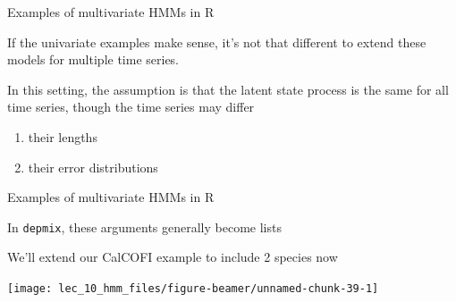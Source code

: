 \documentclass[
  ignorenonframetext,
]{beamer}
\providecommand{\tightlist}{%
  \setlength{\itemsep}{0pt}\setlength{\parskip}{0pt}}
\begin{document}
\begin{frame}{Examples of multivariate HMMs in R}
\protect\hypertarget{examples-of-multivariate-hmms-in-r}{}

If the univariate examples make sense, it's not that different to extend
these models for multiple time series.

In this setting, the assumption is that the latent state process is the
same for all time series, though the time series may differ

\begin{enumerate}
\tightlist
\item
  their lengths
\item
  their error distributions
\end{enumerate}

\end{frame}

\begin{frame}[fragile]{Examples of multivariate HMMs in R}
\protect\hypertarget{examples-of-multivariate-hmms-in-r-1}{}

In \texttt{depmix}, these arguments generally become lists

We'll extend our CalCOFI example to include 2 species now

\begin{center}\texttt{[image: lec\_10\_hmm\_files/figure-beamer/unnamed-chunk-39-1]} \end{center}

\end{frame}
\end{document}
